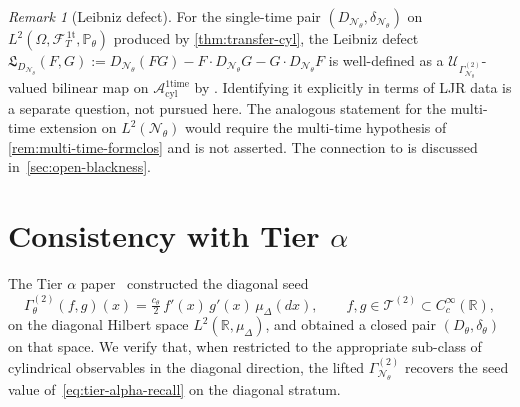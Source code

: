 \documentclass[11pt,reqno]{amsart}
\theoremstyle{plain}
\theoremstyle{definition}
\theoremstyle{remark}
\newtheorem{remark}[theorem]{Remark}
\newcommand{\R}{\mathbb R}
\newcommand{\Prob}{\mathbb P}
\newcommand{\cA}{\mathcal A}
\newcommand{\cF}{\mathcal F}
\newcommand{\cN}{\mathcal N}
\newcommand{\cT}{\mathcal T}
\newcommand{\cU}{\mathcal U}
\newcommand{\Aone}{\cA_{\mathrm{cyl}}^{\mathrm{1time}}}
\newcommand{\FT}{\cF_{T}^{\,\mathrm{1t}}}
\newcommand{\Hone}{L^{2}(\Omega,\FT,\Pth)}
\newcommand{\GamN}{\Gamma^{(2)}_{\cN_{\theta}}}
\newcommand{\GamT}{\Gamma^{(2)}_{\theta}}
\newcommand{\DN}{D_{\cN_{\theta}}}
\newcommand{\divN}{\delta_{\cN_{\theta}}}
\newcommand{\Dth}{D_{\theta}}
\newcommand{\divth}{\delta_{\theta}}
\newcommand{\Pth}{\Prob_{\theta}}
\begin{document}
\begin{remark}[Leibniz defect]\label{rem:leibniz-defect}
For the single-time pair $(\DN,\divN)$ on $\Hone$ produced by
\cref{thm:transfer-cyl}, the Leibniz defect
$\mathfrak L_{\DN}(F,G):=\DN(FG)-F\cdot\DN G-G\cdot\DN F$ is
well-defined as a $\cU_{\GamN}$-valued bilinear map on $\Aone$ by
\cite[Thm.~C]{GammaHierarchyDivergence}. Identifying it explicitly
in terms of LJR data is a separate question, not pursued here. The
analogous statement for the multi-time extension on
$L^{2}(\cN_{\theta})$ would require the multi-time hypothesis of
\cref{rem:multi-time-formclos} and is not asserted. The connection
to \cite[\S 4]{OperatorDerivative} is discussed
in~\cref{sec:open-blackness}.
\end{remark}

\section{Consistency with Tier \texorpdfstring{$\alpha$}{alpha}}\label{sec:consistency}

The Tier $\alpha$ paper~\cite{StickyFlowGammaSeed} constructed the
diagonal seed
\begin{equation}\label{eq:tier-alpha-recall}
  \GamT(f,g)(x)=\tfrac{c_{\theta}}{2}\,f'(x)\,g'(x)\,\mu_{\Delta}(dx),
  \qquad f,g\in\cT^{(2)}\subset C_{c}^{\infty}(\R),
\end{equation}
on the diagonal Hilbert space $L^{2}(\R,\mu_{\Delta})$, and obtained
a closed pair $(\Dth,\divth)$ on that space. We verify that, when
restricted to the appropriate sub-class of cylindrical observables
in the diagonal direction, the lifted $\GamN$ recovers the seed
value of~\eqref{eq:tier-alpha-recall} on the diagonal stratum.
\end{document}
